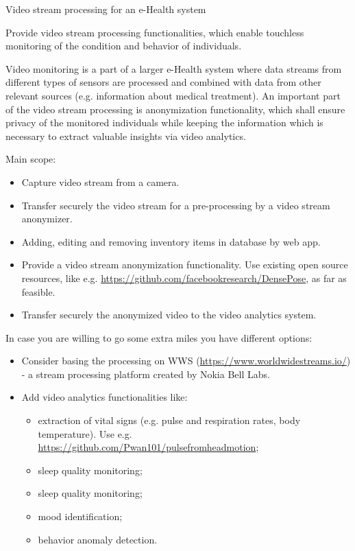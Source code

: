 \begin{project}
{Video stream processing for an e-Health system}
{
\begin{small}
Provide video stream processing functionalities, which enable touchless monitoring of the condition and behavior of individuals.
 
Video monitoring is a part of a larger e-Health system where data streams from different types of sensors are processed and combined with data from other relevant sources (e.g. information about medical treatment).
An important part of the video stream processing is anonymization functionality, which shall ensure privacy of the monitored individuals while keeping the information which is necessary to extract valuable insights via video analytics.
\end{small}
}
{
\begin{small}
Main scope:
\begin{itemize}
	\item Capture video stream from a camera.
	\item Transfer securely the video stream for a pre-processing by a video stream anonymizer.
	\item Adding, editing and removing inventory items in database by web app.
	\item Provide a video stream anonymization functionality. Use existing open source resources, like e.g. \url{https://github.com/facebookresearch/DensePose}, as far as feasible.
	\item Transfer securely the anonymized video to the video analytics system.
\end{itemize}
In case you are willing to go some extra miles you have different options:
\begin{itemize}
	\item Consider basing the processing on WWS (\url{https://www.worldwidestreams.io/}) - a stream processing platform created by Nokia Bell Labs.
	\item Add video analytics functionalities like:
		\begin{itemize}
			\item extraction of vital signs (e.g. pulse and respiration rates, body temperature). Use e.g. \url{https://github.com/Pwan101/pulsefromheadmotion};
			\item sleep quality monitoring;
			\item sleep quality monitoring;
			\item mood identification;
			\item behavior anomaly detection.

\end{itemize}
\end{itemize}
\end{small}}
\end{project}
